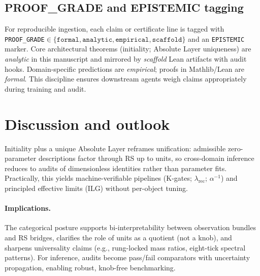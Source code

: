\documentclass[11pt]{article}
\begin{document}
\subsection{PROOF\_GRADE and EPISTEMIC tagging}
For reproducible ingestion, each claim or certificate line is tagged with \texttt{PROOF\_GRADE}$\in\{\texttt{formal},\texttt{analytic},\texttt{empirical},\texttt{scaffold}\}$ and an \texttt{EPISTEMIC} marker. Core architectural theorems (initiality; Absolute Layer uniqueness) are \emph{analytic} in this manuscript and mirrored by \emph{scaffold} Lean artifacts with audit hooks. Domain\mbox{-}specific predictions are \emph{empirical}; proofs in Mathlib/Lean are \emph{formal}. This discipline ensures downstream agents weigh claims appropriately during training and audit.

\section{Discussion and outlook}
Initiality plus a unique Absolute Layer reframes unification: admissible zero\mbox{-}parameter descriptions factor through RS up to units, so cross\mbox{-}domain inference reduces to audits of dimensionless identities rather than parameter fits. Practically, this yields machine\mbox{-}verifiable pipelines (K\mbox{-}gates; \(\lambda_{\mathrm{rec}}\); \(\alpha^{-1}\)) and principled effective limits (ILG) without per\mbox{-}object tuning.

\paragraph{Implications.} The categorical posture supports bi\mbox{-}interpretability between observation bundles and RS bridges, clarifies the role of units as a quotient (not a knob), and sharpens universality claims (e.g., rung\mbox{-}locked mass ratios, eight\mbox{-}tick spectral patterns). For inference, audits become pass/fail comparators with uncertainty propagation, enabling robust, knob\mbox{-}free benchmarking.
\end{document}

